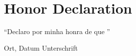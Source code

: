 \cleardoubleoddpage	
\chapter*{Honor Declaration}
\thispagestyle{empty} %

\enquote{Declaro por minha honra de que }

\vspace{4cm}

\hspace{2cm} Ort, Datum \hfill Unterschrift \hspace{2cm}